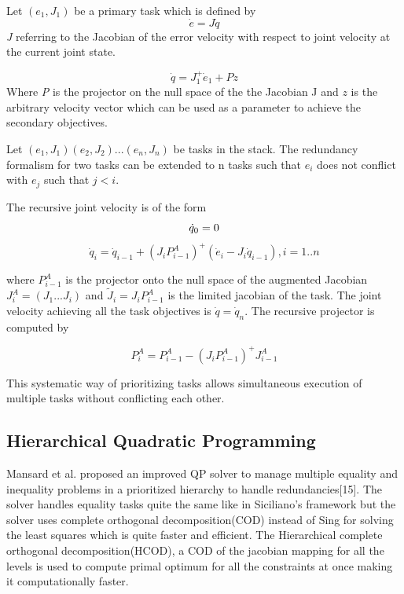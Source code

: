 Let $(e_{1},J_{1})$ be a primary task  which is defined by  
\begin{equation} \label{eq:tf1}
\dot{e} = J\dot{q} 
\end{equation}
 \textit{J} referring to the Jacobian of the error velocity with respect to joint velocity at the current joint state.


\begin{equation} \label{eq:tf3}
\dot{q} = J_{1}^{+}\dot{e}_{1} + Pz
\end{equation}
 Where \textit{P} is the projector on the null space of the the Jacobian J and \textit{ $z$ } is the arbitrary velocity vector which can be used as a parameter to achieve the secondary objectives. 

Let $(e_{1},J_{1})(e_{2},J_{2})...(e_{n},J_{n})$ be tasks in the stack. The redundancy formalism for two tasks can be extended to n tasks such that $e_{i}$ does not conflict with $e_{j}$ such that $j<i$. 


The recursive joint velocity is of the form
\begin{equation} \label{eq:ntasks}
  \dot{q}_{0} = 0\\
\end{equation}
\begin{equation}
  \dot{q}_{i} = \dot{q}_{i-1}+ (J_{i}P^{A}_{i-1})^{+}(\dot{e}_{i} - J_{i}\dot{q}_{i-1}), i= 1..n
\end{equation}



 where $P^{A}_{i-1}$ is the projector onto the null space of the augmented Jacobian $J_i^A = (J_1...J_i)$ and $\widetilde{J}_i = J_iP_{i-1}^A$ is the limited jacobian of the task. The joint velocity achieving all the task objectives is $\dot{q} = \dot{q}_n$. The recursive projector is computed by 
 
 \[P^A_i = P^A_{i-1} - (J_iP_{i-1}^A)^+J^A_{i-1}  \] 
 
 This systematic way of prioritizing tasks allows simultaneous execution of multiple tasks without conflicting each other.
 
\subsection{Hierarchical Quadratic Programming}
Mansard et al. proposed an improved QP solver to manage multiple equality and inequality problems in a prioritized hierarchy to handle redundancies[15]. The solver handles equality tasks quite the same like in Siciliano's framework but the solver uses complete orthogonal decomposition(COD) instead of Sing for solving the least squares which is quite faster and efficient. The Hierarchical complete orthogonal decomposition(HCOD), a COD of the jacobian mapping for all the levels is used to compute primal optimum for all the constraints at once making it computationally faster. 

